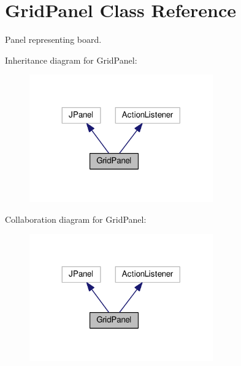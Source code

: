\hypertarget{classGridPanel}{}\section{Grid\+Panel Class Reference}
\label{classGridPanel}


Panel representing board.  




Inheritance diagram for Grid\+Panel\+:
\nopagebreak
\begin{figure}[H]
\begin{center}
\leavevmode
\includegraphics[width=224pt]{classGridPanel__inherit__graph}
\end{center}
\end{figure}


Collaboration diagram for Grid\+Panel\+:
\nopagebreak
\begin{figure}[H]
\begin{center}
\leavevmode
\includegraphics[width=224pt]{classGridPanel__coll__graph}
\end{center}
\end{figure}
